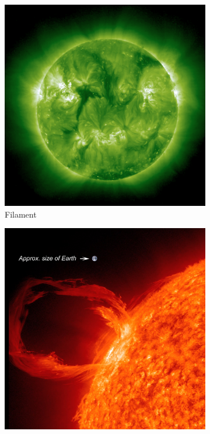 \message{ !name(main.tex)}\documentclass[12pt]{article}
\begin{document}
\begin{figure}
     \begin{subfigure}[b]{0.5\textwidth}
         \centering
         \includegraphics[width=\textwidth]{images/195_Filament.png}
         \caption{Filament}
         \label{fig:filament}
     \end{subfigure}
     \hfill
     \begin{subfigure}[b]{0.5\textwidth}
         \centering
         \includegraphics[width=\textwidth]{images/prominence.jpg}

\end{subfigure}
\end{figure}
\end{document}
